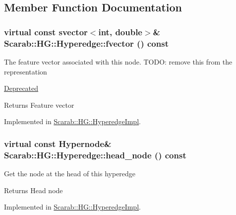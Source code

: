 \subsection{Member Function Documentation}
\hypertarget{classScarab_1_1HG_1_1Hyperedge_a0d201ddb955631aadee4c15cc8e709f8}{
\subsubsection[{fvector}]{\setlength{\rightskip}{0pt plus 5cm}virtual const {\bf svector}$<$int, double$>$\& Scarab::HG::Hyperedge::fvector () const}}
\label{classScarab_1_1HG_1_1Hyperedge_a0d201ddb955631aadee4c15cc8e709f8}
The feature vector associated with this node. TODO: remove this from the representation \begin{Desc}
\item[\hyperlink{deprecated__deprecated000005}{Deprecated}]\end{Desc}
\begin{DoxyReturn}{Returns}
Feature vector 
\end{DoxyReturn}


Implemented in \hyperlink{classScarab_1_1HG_1_1HyperedgeImpl_a359446c285164a93995bb87e6ea74882}{Scarab::HG::HyperedgeImpl}.

\hypertarget{classScarab_1_1HG_1_1Hyperedge_a6043de341070c103d811f5286193dd46}{
\subsubsection[{head\_\-node}]{\setlength{\rightskip}{0pt plus 5cm}virtual const {\bf Hypernode}\& Scarab::HG::Hyperedge::head\_\-node () const}}
\label{classScarab_1_1HG_1_1Hyperedge_a6043de341070c103d811f5286193dd46}
Get the node at the head of this hyperedge

\begin{DoxyReturn}{Returns}
Head node 
\end{DoxyReturn}


Implemented in \hyperlink{classScarab_1_1HG_1_1HyperedgeImpl_ae194bfc8ecac2a12791fa36c1c2c62a7}{Scarab::HG::HyperedgeImpl}.


